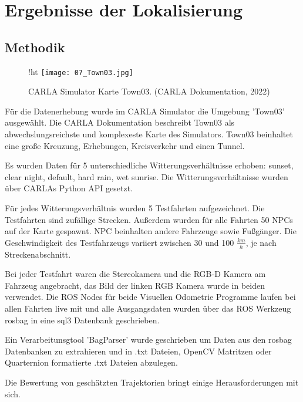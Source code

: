 \chapter{Ergebnisse der Lokalisierung}
\section{Methodik}
\begin{figure}{!ht}
	\centering
	\texttt{[image: 07\_Town03.jpg]}
	\caption[CARLA Simulator Karte Town03]{CARLA Simulator Karte Town03. (CARLA Dokumentation, 2022)}
\end{figure}

Für die Datenerhebung wurde im CARLA Simulator die Umgebung 'Town03' ausgewählt. Die CARLA Dokumentation beschreibt Town03 als abwechslungsreichste und komplexeste Karte des Simulators. Town03 beinhaltet eine gro{\ss}e Kreuzung, Erhebungen, Kreisverkehr und einen Tunnel.
\newline

Es wurden Daten für 5 unterschiedliche Witterungsverhältnisse erhoben: sunset, clear night, default, hard rain, wet sunrise. Die Witterungsverhältnisse wurden über CARLAs Python API gesetzt.
\newline 

Für jedes Witterungsverhältnis wurden 5 Testfahrten aufgezeichnet. Die Testfahrten sind zufällige Strecken. Au{\ss}erdem wurden für alle Fahrten 50 NPCs auf der Karte gespawnt. NPC beinhalten andere Fahrzeuge sowie Fu{\ss}gänger. Die Geschwindigkeit des Testfahrzeugs variiert zwischen 30 und 100 $\frac{km}{h}$, je nach Streckenabschnitt.
\newline

Bei jeder Testfahrt waren die Stereokamera und die RGB-D Kamera am Fahrzeug angebracht, das Bild der linken RGB Kamera wurde in beiden verwendet. Die ROS Nodes für beide Visuellen Odometrie Programme laufen bei allen Fahrten live mit und alle Ausgangsdaten wurden über das ROS Werkzeug rosbag in eine sql3 Datenbank geschrieben.
\newline

Ein Verarbeitunsgtool 'BagParser' wurde geschrieben um Daten aus den rosbag Datenbanken zu extrahieren und in .txt Dateien, OpenCV Matritzen oder Quarternion formatierte .txt Dateien abzulegen. 
\newline

Die Bewertung von geschätzten Trajektorien bringt einige Herausforderungen mit sich. 

